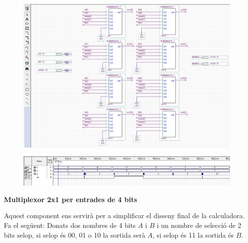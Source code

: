 \documentclass[12pt, a4papre]{article}
\begin{document}
	\begin{center}
	\begin{figure}[H]
		\begin{center}
		\includegraphics[width=150mm]{selectormult.jpeg}
		\end{center}
	\end{figure}
	\end{center}
	\begin{center}
	\begin{figure}[H]
		\begin{center}
		\includegraphics[width=150mm]{simuladoraelevador.jpeg}
		\end{center}
	\end{figure}
	\end{center}
	
	\textbf{\large{Multiplexor 2x1 per entrades de 4 bits}}
	
	Aquest component ens servirà per a simplificar el disseny final de la calculadora. Fa el següent: Donats dos nombres de 4 bits $A$ i $B$ i un nombre de selecció de 2 bits selop, si selop és 00, 01 o 10 la sortida serà $A$, si selop és 11 la sortida és $B$.
	
\end{document}
